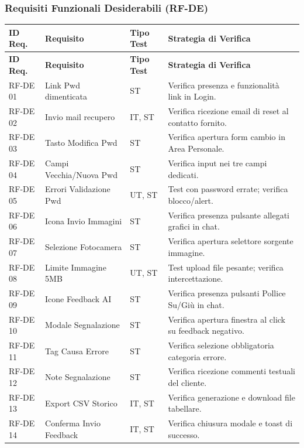 \documentclass[a4paper,11pt,oneside]{scrartcl}
\begin{document}
\newpage
\subsubsection{Requisiti Funzionali Desiderabili (RF-DE)}

\begin{longtable}{|p{1.5cm}|p{5.5cm}|p{1.8cm}|p{5cm}|}
\hline
\textbf{ID Req.} & \textbf{Requisito} & \textbf{Tipo Test} & \textbf{Strategia di Verifica} \\
\hline
\endfirsthead
\hline
\textbf{ID Req.} & \textbf{Requisito} & \textbf{Tipo Test} & \textbf{Strategia di Verifica} \\
\hline
\endhead

RF-DE 01 & Link Pwd dimenticata & ST & Verifica presenza e funzionalità link in Login. \\ \hline
RF-DE 02 & Invio mail recupero & IT, ST & Verifica ricezione email di reset al contatto fornito. \\ \hline
RF-DE 03 & Tasto Modifica Pwd & ST & Verifica apertura form cambio in Area Personale. \\ \hline
RF-DE 04 & Campi Vecchia/Nuova Pwd & ST & Verifica input nei tre campi dedicati. \\ \hline
RF-DE 05 & Errori Validazione Pwd & UT, ST & Test con password errate; verifica blocco/alert. \\ \hline
RF-DE 06 & Icona Invio Immagini & ST & Verifica presenza pulsante allegati grafici in chat. \\ \hline
RF-DE 07 & Selezione Fotocamera & ST & Verifica apertura selettore sorgente immagine. \\ \hline
RF-DE 08 & Limite Immagine 5MB & UT, ST & Test upload file pesante; verifica intercettazione. \\ \hline
RF-DE 09 & Icone Feedback AI & ST & Verifica presenza pulsanti Pollice Su/Giù in chat. \\ \hline
RF-DE 10 & Modale Segnalazione & ST & Verifica apertura finestra al click su feedback negativo. \\ \hline
RF-DE 11 & Tag Causa Errore & ST & Verifica selezione obbligatoria categoria errore. \\ \hline
RF-DE 12 & Note Segnalazione & ST & Verifica ricezione commenti testuali del cliente. \\ \hline
RF-DE 13 & Export CSV Storico & IT, ST & Verifica generazione e download file tabellare. \\ \hline
RF-DE 14 & Conferma Invio Feedback & IT, ST & Verifica chiusura modale e toast di successo. \\ \hline

\end{longtable}
\end{document}
